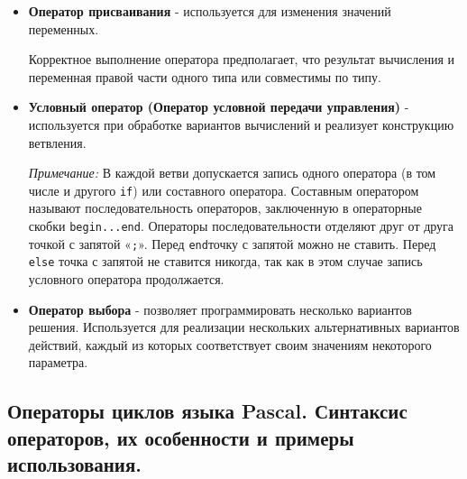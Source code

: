 \begin{itemize}

    \item {\bf{Оператор присваивания}} - используется для изменения значений переменных.

    Корректное выполнение оператора предполагает, что результат вычисления и переменная правой части одного типа или совместимы по типу.


    \item {\bf{Условный оператор (Оператор условной передачи управления)}} - используется при обработке вариантов вычислений и реализует конструкцию ветвления.


    {\small {\it Примечание:} В каждой ветви допускается запись одного оператора (в том числе и другого \texttt{if}) или составного оператора. Составным оператором называют последовательность операторов, заключенную в операторные скобки \texttt{begin...end}. Операторы последовательности отделяют друг от друга точкой с запятой «\texttt{;}». Перед \texttt{end}точку с запятой можно не ставить. Перед \texttt{else} точка с запятой не ставится никогда, так как в этом случае запись условного оператора продолжается.}

    \item {\bf{Оператор выбора}} - позволяет программировать несколько вариантов решения. Используется для реализации нескольких альтернативных вариантов действий, каждый из которых соответствует своим значениям некоторого параметра.


\end{itemize}






\newpage\subsection{Операторы циклов языка Pascal. Синтаксис операторов, их особенности и примеры использования. }

\begin{myquote}
        
\end{myquote}

